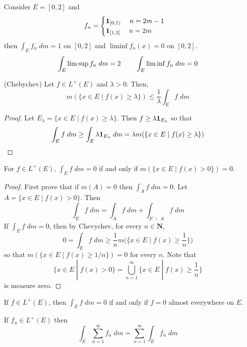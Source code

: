 \vspace{2ex}
\begin{ex}
Consider $E=[0,2]$ and 
\[f_{n}=\begin{cases}
{\bf 1}_{[0,1)}\hspace{3ex}n=2m-1\\
{\bf 1}_{[1,2]}\hspace{3ex}n=2m
\end{cases}\]
then $\int _{E}f_{n}\;d m=1$ on $[0,2]$ and $\liminf f_{n}(x)=0$ on $[0,2]$. 
\[\int _{E}\limsup f_{n}\;d m=2\hspace{5ex}\int _{E}\liminf f_{n}\;d m=0\]
\end{ex}
\vspace{2ex}
\begin{thm}
(Chebychev) Let $f\in L^{+}(E)$ and $\lambda >0$. Then,
\[m(\{x\in E \;|\; f(x)\geq \lambda \})\leq\dfrac{1}{\lambda }\int _{E}f\;d m\]
\end{thm}
\vspace{2ex}
\begin{proof}
Let $E_{\lambda }=\{x\in E \;|\; f(x)\geq \lambda \}$. Then $f\geq \lambda {\bf 1}_{E_{\lambda }}$ so that
\[\int _{E}f\;d m\geq \int _{E}\lambda {\bf 1}_{E_{\lambda }}\;d m=\lambda m(\{x\in E \;|\; f(x)\geq \lambda \})\]
\end{proof}
\vspace{2ex}
\begin{thm}
For $f\in L^{+}(E)$, $\int _{E}f\;d m=0$ if and only if $m(\{x\in E \;|\; f(x)>0\})=0$. 
\end{thm}
\vspace{2ex}
\begin{proof}
First prove that if $m(A)=0$ then $\int _{A}f\;d m=0$. Let $A=\{x\in E \;|\; f(x)>0\}$. Then
\[\int _{E}f\;d m=\int _{A}f\;d m+\int _{E\;\backslash\;A}f\;d m\]
If $\int _{E}f\;d m=0$, then by Chevychev, for every $n\in {\bm N}$,
\[0=\int _{E}f\;dm\geq \dfrac{1}{n}m\Big(\Big\{x\in E \;\Big|\; f(x)\geq \dfrac{1}{n}\Big\}\Big)\]
so that $m(\{x\in E \;|\; f(x)\geq {1}/{n}\})=0$ for every $n$. Note that
\[\{x\in E \;|\; f(x)>0\}=\bigcup ^{\infty }_{n=1}\Big\{x\in E \;|\; f(x)\geq \dfrac{1}{n}\Big\}\]
is measure zero.
\end{proof}
\vspace{2ex}
\begin{cor}
If $f\in L^{+}(E)$, then $\int _{E}f\;d m=0$ if and only if $f=0$ almost everywhere on $E$. 
\end{cor}
\vspace{2ex}
\begin{thm}
If $f_{n}\in L^{+}(E)$ then 
\[\int _{E}\sum ^{\infty }_{n=1}f_{n}\;d m=\sum ^{\infty }_{n=1}\int _{E}f_{n}\;d m\]
\end{thm}
